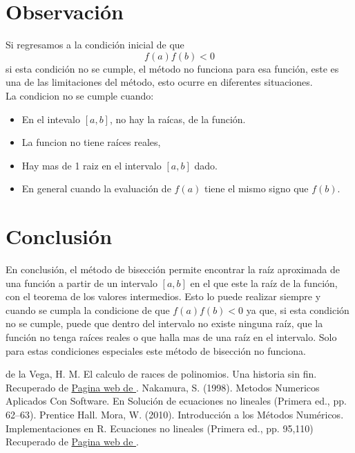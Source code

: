 \documentclass[12pt]{article}
\begin{document}
		\section*{\centering Observación}\label{sec:Observacion}
			Si regresamos a la condición inicial de que $$ f(a)f(b) < 0 $$
			si esta condición no se cumple, el método no funciona para esa función, este es una de las 
			limitaciones del método, esto ocurre en diferentes situaciones.\\
			La condicion no se cumple cuando:
			\begin{itemize}
				\item En el intevalo $ [a,b] $, no hay la raícas, de la función.
				\item La funcion no tiene raíces reales,
				\item Hay mas de 1 raiz en el intervalo $ [a,b] $ dado.
				\item En general cuando la evaluación de $ f(a) $ tiene el mismo signo que $ f(b) $.
			\end{itemize}
		

		\section*{\centering Conclusión}\label{sec:Conclusion}
			En conclusión, el método de bisección permite encontrar la raíz aproximada de una función a partir 
			de un intervalo $ [a,b] $ en el que este la raíz de la función, con el teorema de los valores intermedios. 
			Esto lo puede realizar siempre y cuando se cumpla la condicione de que $ f(a)f(b) < 0 $ ya que, si esta condición no 
			se cumple, puede que dentro del intervalo no existe ninguna raíz, que la función no tenga raíces 
			reales o que halla mas de una raíz en el intervalo. Solo para estas condiciones especiales este 
			método de bisección no funciona.

		\centering
		\begin{thebibliography}{10}
			 de la Vega, H. M. El calculo de raıces de polinomios. Una historia sin fin. Recuperado de
							\href{http://www.matedu.cinvestav.mx/~elcalculoysuensenanza/investigacion/articulosPDF/Madrid.pdf}{Pagina web de \cite{bib:item1}}.
			 Nakamura, S. (1998). Metodos Numericos Aplicados Con Software. En Solución de ecuaciones no lineales (Primera ed., pp. 62–63). Prentice Hall.
			 Mora, W. (2010). Introducción a los Métodos Numéricos. Implementaciones en R. Ecuaciones no lineales (Primera ed., pp. 95,110) Recuperado de
							\href{https://tecdigital.tec.ac.cr/revistamatematica/Libros/WMora_MetodosNumericos/2017_Principal_MetodosNumericos-con-R.pdf}{Pagina web de \cite{bib:item3}}. 
							
			
		\end{thebibliography}

	
\end{document}
